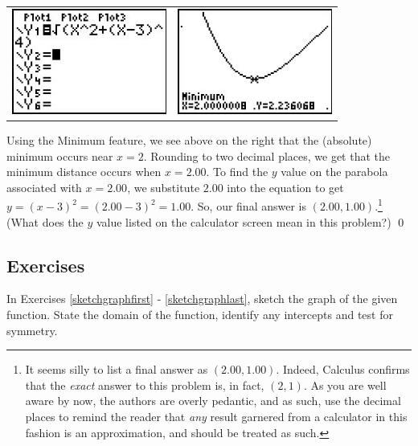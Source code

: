 \begin{ex}
\begin{center}
\begin{tabular}{cc}
\includegraphics[width=2in]{./RelationsandFunctionsGraphics/YEQU1.jpg} \hspace{.75in} &
\includegraphics[width=2in]{./RelationsandFunctionsGraphics/DISTBOX1.jpg} \\

\end{tabular}

\end{center}

Using the Minimum feature, we see above on the right that the (absolute) minimum occurs near $x=2$.  Rounding to two decimal places, we get that the minimum distance occurs when $x = 2.00$.  To find the $y$ value on the parabola associated with $x = 2.00$, we substitute $2.00$ into the equation to get $y = (x-3)^2 = (2.00-3)^2 = 1.00$.  So, our final answer is $(2.00,1.00).$\footnote{It seems silly to list a final answer as $(2.00, 1.00)$.  Indeed, Calculus confirms that the \emph{exact} answer to this problem is, in fact, $(2,1)$.  As you are well aware by now, the authors are overly pedantic, and as such, use the decimal places to remind the reader that \emph{any} result garnered from a calculator in this fashion is an approximation, and should be treated as such.}  (What does the $y$ value listed on the calculator screen mean in this problem?)  \qed

\end{ex}

\newpage

\subsection{Exercises}
\label{GraphsofFunctionsExercises}

In Exercises \ref{sketchgraphfirst} - \ref{sketchgraphlast}, sketch the graph of the given function.  State the domain of the function, identify any intercepts and test for symmetry.

